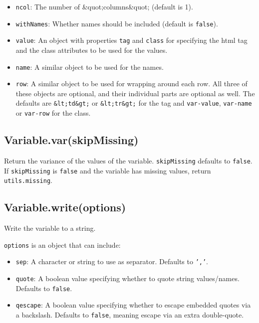 \documentclass{article}
\begin{document}
\begin{itemize}

\item \texttt{ncol}: The number of \&quot;columns\&quot; (default is 1).

\item \texttt{withNames}: Whether names should be included (default is \texttt{false}).

\item \texttt{value}: An object with properties \texttt{tag} and \texttt{class} for specifying the
  html tag and the class attributes to be used for the values.

\item \texttt{name}:  A similar object to be used for the names.

\item \texttt{row}:   A similar object to be used for wrapping around each row.
All three of these objects are optional, and their individual parts are
optional as well. The defaults are \texttt{\&lt;td\&gt;} or \texttt{\&lt;tr\&gt;} for the tag and
\texttt{var-value}, \texttt{var-name} or \texttt{var-row} for the class.

\end{itemize}

    \subsection{Variable.var(skipMissing)}
    Return the variance of the values of the variable.
\texttt{skipMissing} defaults to \texttt{false}.  If \texttt{skipMissing} is \texttt{false} and
the variable has missing values, return \texttt{utils.missing}.


    \subsection{Variable.write(options)}
    Write the variable to a string.


\texttt{options} is an object that can include:


\begin{itemize}

\item \texttt{sep}: A character or string to use as separator. Defaults to \texttt{','}.

\item \texttt{quote}: A boolean value specifying whether to quote string values/names. Defaults
 to \texttt{false}.

\item \texttt{qescape}: A boolean value specifying whether to escape embedded quotes via a
 backslash. Defaults to \texttt{false}, meaning escape via an extra double-quote.

\end{itemize}
\end{document}
